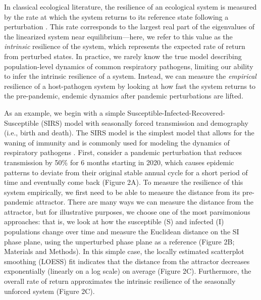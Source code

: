 \documentclass[12pt]{article}
\begin{document}
In classical ecological literature, the resilience of an ecological system is measured by the rate at which the system returns to its reference state following a perturbation \citep{pimm1979structure, neubert1997alternatives,gunderson2000ecological,dakos2022ecological}.
This rate corresponds to the largest real part of the eigenvalues of the linearized system near equilibrium---here, we refer to this value as the \emph{intrinsic} resilience of the system, which represents the expected rate of return from perturbed states.
In practice, we rarely know the true model describing population-level dynamics of common respiratory pathogens, limiting our ability to infer the intrinsic resilience of a system.
Instead, we can measure the \emph{empirical} resilience of a host-pathogen system by looking at how fast the system returns to the pre-pandemic, endemic dynamics after pandemic perturbations are lifted.

As an example, we begin with a simple Susceptible-Infected-Recovered-Susceptible (SIRS) model with seasonally forced transmission and demography (i.e., birth and death).
The SIRS model is the simplest model that allows for the waning of immunity and is commonly used for modeling the dynamics of respiratory pathogens \citep{dushoff2004dynamical}.
First, consider a pandemic perturbation that reduces transmission by 50\% for 6 months starting in 2020, which causes epidemic patterns to deviate from their original stable annual cycle for a short period of time and eventually come back (Figure 2A).
To measure the resilience of this system empirically, we first need to be able to measure the distance from its pre-pandemic attractor.
There are many ways we can measure the distance from the attractor, but for illustrative purposes, we choose one of the most parsimonious approaches: that is, we look at how the susceptible (S) and infected (I) populations change over time and measure the Euclidean distance on the SI phase plane, using the unperturbed phase plane as a reference (Figure 2B; Materials and Methods).
In this simple case, the locally estimated scatterplot smoothing (LOESS) fit indicates that the distance from the attractor decreases exponentially (linearly on a log scale) on average (Figure 2C).
Furthermore, the overall rate of return approximates the intrinsic resilience of the seasonally unforced system (Figure 2C).
\end{document}
